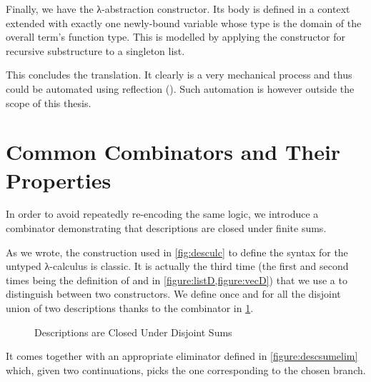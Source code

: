 Finally, we have the λ-abstraction constructor. Its body is defined in
a context extended with exactly one newly-bound variable whose type is
the domain of the overall term's function type. This is modelled by
applying the constructor for recursive substructure to a singleton list.

\noindent\begin{minipage}[t]{0.4\textwidth}
\end{minipage}\begin{minipage}[t]{0.6\textwidth}
  \begin{AgdaSuppressSpace}
  \end{AgdaSuppressSpace}
\end{minipage}

This concludes the translation. It clearly is a very mechanical process
and thus could be automated using reflection
(\cite{DBLP:conf/ifl/WaltS12,thesis:christiansen}). Such automation is however
outside the scope of this thesis.

\section{Common Combinators and Their Properties}
\label{desccomb}

In order to avoid repeatedly re-encoding the same logic, we introduce
a combinator demonstrating that descriptions are closed under finite
sums.

As we wrote, the construction used in \cref{fig:desculc} to define the
syntax for the untyped λ-calculus is classic. It is actually the third
time (the first and second times being the definition of  and
 in \cref{figure:listD,figure:vecD}) that we use a 
to distinguish between two constructors. We define once and for all
the disjoint union of two descriptions thanks to the  combinator
in \cref{figure:descsum}.

\begin{figure}[h]
  \caption{Descriptions are Closed Under Disjoint Sums\label{figure:descsum}}
\end{figure}

It comes together with an appropriate eliminator  defined in
\cref{figure:descsumelim} which, given two continuations, picks the one
corresponding to the chosen branch.

